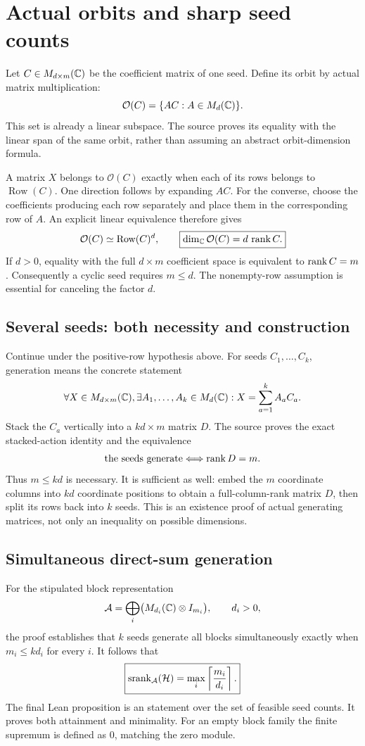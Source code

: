 \section{Actual orbits and sharp seed counts}\label{supp3:section:001}
Let $C\in M_{d\times m}(\C)$ be the coefficient matrix of one seed. Define its orbit by actual matrix multiplication:
\[
\mathcal O(C)=\{AC:A\in M_d(\C)\}.
\]
This set is already a linear subspace. The source proves its equality with the linear span of the same orbit, rather than assuming an abstract orbit-dimension formula.

A matrix $X$ belongs to $\mathcal O(C)$ exactly when each of its rows belongs to $\operatorname{Row}(C)$. One direction follows by expanding $AC$. For the converse, choose the coefficients producing each row separately and place them in the corresponding row of $A$. An explicit linear equivalence therefore gives
\[
\mathcal O(C)\simeq \operatorname{Row}(C)^d,
\qquad
\boxed{\dim_\C\mathcal O(C)=d\,\rank C.}
\]
If $d>0$, equality with the full $d\times m$ coefficient space is equivalent to $\operatorname{rank} C=m$. Consequently a cyclic seed requires $m\le d$. The nonempty-row assumption is essential for canceling the factor $d$.

\subsection{Several seeds: both necessity and construction}
Continue under the positive-row hypothesis above. For seeds $C_1,\ldots,C_k$, generation means the concrete statement
\[
\forall X\in M_{d\times m}(\C),\quad
\exists A_1,\ldots,A_k\in M_d(\C):\quad
X=\sum_{a=1}^k A_aC_a.
\]
Stack the $C_a$ vertically into a $kd\times m$ matrix $D$. The source proves the exact stacked-action identity and the equivalence
\[
\text{the seeds generate}\Longleftrightarrow\operatorname{rank} D=m.
\]
Thus $m\le kd$ is necessary. It is sufficient as well: embed the $m$ coordinate columns into $kd$ coordinate positions to obtain a full-column-rank matrix $D$, then split its rows back into $k$ seeds. This is an existence proof of actual generating matrices, not only an inequality on possible dimensions.

\subsection{Simultaneous direct-sum generation}
For the stipulated block representation
\[
\mathcal A=\bigoplus_i\bigl(M_{d_i}(\C)\otimes I_{m_i}\bigr),\qquad d_i>0,
\]
the proof establishes that $k$ seeds generate all blocks simultaneously exactly when $m_i\le kd_i$ for every $i$. It follows that
\[
\boxed{\srank_{\mathcal A}(\mathcal H)=\max_i\left\lceil\frac{m_i}{d_i}\right\rceil.}
\]
The final Lean proposition is an  statement over the set of feasible seed counts. It proves both attainment and minimality. For an empty block family the finite supremum is defined as $0$, matching the zero module.






